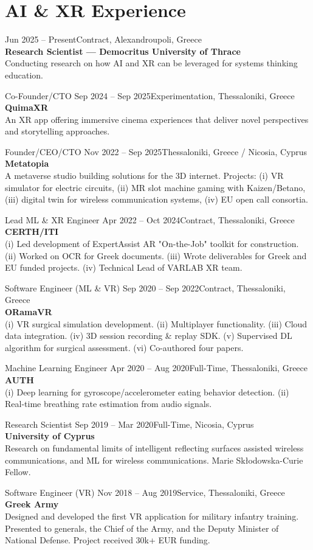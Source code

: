 \documentclass[a4paper,10pt]{article}
\newcommand{\entry}[4]{%
  \vspace{5pt}
  {\fontsize{9}{11}\selectfont\color{texttertiary}#1\hfill#2}\\[1pt]
  {\fontsize{10.5}{13}\selectfont\bfseries #3}\\[1pt]
  {\fontsize{9}{12}\selectfont\color{textsecondary}#4}
  \vspace{2pt}
}
\begin{document}
\section{AI \& XR Experience}

\entry{Jun 2025 -- Present}{Contract, Alexandroupoli, Greece}
{Research Scientist — Democritus University of Thrace}
{Conducting research on how AI and XR can be leveraged for systems thinking education.}

\entry{Co-Founder/CTO \hfill Sep 2024 -- Sep 2025}{Experimentation, Thessaloniki, Greece}
{QuimaXR}
{An XR app offering immersive cinema experiences that deliver novel perspectives and storytelling approaches.}

\entry{Founder/CEO/CTO \hfill Nov 2022 -- Sep 2025}{Thessaloniki, Greece / Nicosia, Cyprus}
{Metatopia}
{A metaverse studio building solutions for the 3D internet. Projects: (i) VR simulator for electric circuits, (ii) MR slot machine gaming with Kaizen/Betano, (iii) digital twin for wireless communication systems, (iv) EU open call consortia.}

\entry{Lead ML \& XR Engineer \hfill Apr 2022 -- Oct 2024}{Contract, Thessaloniki, Greece}
{CERTH/ITI}
{(i) Led development of ExpertAssist AR "On-the-Job" toolkit for construction. (ii) Worked on OCR for Greek documents. (iii) Wrote deliverables for Greek and EU funded projects. (iv) Technical Lead of VARLAB XR team.}

\entry{Software Engineer (ML \& VR) \hfill Sep 2020 -- Sep 2022}{Contract, Thessaloniki, Greece}
{ORamaVR}
{(i) VR surgical simulation development. (ii) Multiplayer functionality. (iii) Cloud data integration. (iv) 3D session recording \& replay SDK. (v) Supervised DL algorithm for surgical assessment. (vi) Co-authored four papers.}

\entry{Machine Learning Engineer \hfill Apr 2020 -- Aug 2020}{Full-Time, Thessaloniki, Greece}
{AUTH}
{(i) Deep learning for gyroscope/accelerometer eating behavior detection. (ii) Real-time breathing rate estimation from audio signals.}

\entry{Research Scientist \hfill Sep 2019 -- Mar 2020}{Full-Time, Nicosia, Cyprus}
{University of Cyprus}
{Research on fundamental limits of intelligent reflecting surfaces assisted wireless communications, and ML for wireless communications. Marie Skłodowska-Curie Fellow.}

\entry{Software Engineer (VR) \hfill Nov 2018 -- Aug 2019}{Service, Thessaloniki, Greece}
{Greek Army}
{Designed and developed the first VR application for military infantry training. Presented to generals, the Chief of the Army, and the Deputy Minister of National Defense. Project received 30k+ EUR funding.}
\end{document}
